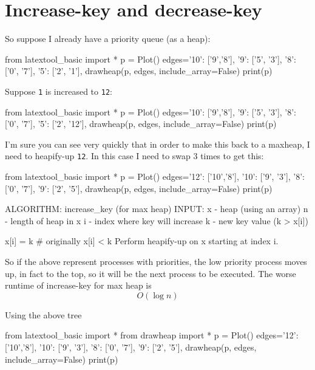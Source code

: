 \section{Increase-key and decrease-key}

So suppose I already have a priority queue (as a heap):

\begin{python}
from latextool_basic import *
p = Plot()
edges={'10': ['9','8'],
       '9': ['5', '3'],
       '8': ['0', '7'],
       '5': ['2', '1'],
     }
drawheap(p, edges, include_array=False)
print(p)
\end{python}


Suppose \texttt{1} is increased to \texttt{12}:

\begin{python}
from latextool_basic import *
p = Plot()
edges={'10': ['9','8'],
       '9': ['5', '3'],
       '8': ['0', '7'],
       '5': ['2', '12'],
     }
drawheap(p, edges, include_array=False)
print(p)
\end{python}


I'm sure you can see very quickly that in order to make this back to
a maxheap, I need to heapify-up \texttt{12}.
In this case I need to swap 3 times to get this:

\begin{python}
from latextool_basic import *
p = Plot()
edges={'12': ['10','8'],
       '10': ['9', '3'],
       '8': ['0', '7'],
       '9': ['2', '5'],
     }
drawheap(p, edges, include_array=False)
print(p)
\end{python}

\begin{console}
ALGORITHM: increase_key (for max heap)
INPUT: x - heap (using an array)
       n - length of heap in x
       i - index where key will increase
       k - new key value (k > x[i])

x[i] = k # originally x[i] < k
Perform heapify-up on x starting at index i.
\end{console}
So if the above represent processes with priorities, the low priority
process moves up, in fact to the top, so it will be the next process to
be executed.
The worse runtime of increase-key for max heap is
\[
O(\log n)
\]

Using the above tree

\begin{python}
from latextool_basic import *
from drawheap import *  
p = Plot()
edges={'12': ['10','8'],
       '10': ['9', '3'],
       '8': ['0', '7'],
       '9': ['2', '5'],
     }
drawheap(p, edges, include_array=False)
print(p)
\end{python}

